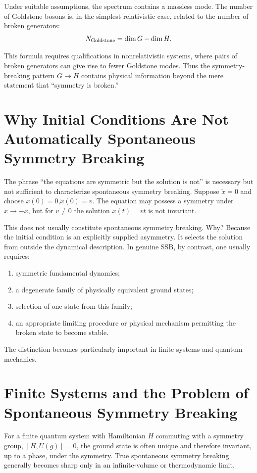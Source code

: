Under suitable assumptions, the spectrum contains a massless mode.
The number of Goldstone bosons is, in the simplest relativistic case, related
to the number of broken generators:
\[N_{\rm Goldstone}=\dim G-\dim H.\]

This formula requires qualifications in nonrelativistic systems, where pairs of
broken generators can give rise to fewer Goldstone modes.
Thus the symmetry-breaking pattern $G\rightarrow H$
contains physical information beyond the mere statement that ``symmetry is broken.''

\section{Why Initial Conditions Are Not Automatically Spontaneous Symmetry Breaking}
The phrase ``the equations are symmetric but the solution is not'' is necessary
but not sufficient to characterize spontaneous symmetry breaking.
Suppose $\ddot{x}=0$ and choose $x(0)=0$,$\dot{x}(0)=v$.
The equation may possess a symmetry under $x\rightarrow-x$,
but for $v\neq0$ the solution $x(t)=vt$ is not invariant.

This does not usually constitute spontaneous symmetry breaking.
Why?
Because the initial condition is an explicitly supplied asymmetry.  It selects
the solution from outside the dynamical description.
In genuine SSB, by contrast, one usually requires:
\begin{enumerate}
\item symmetric fundamental dynamics;
\item a degenerate family of physically equivalent ground states;
\item selection of one state from this family;
\item an appropriate limiting procedure or physical mechanism permitting the
    broken state to become stable.
\end{enumerate}
The distinction becomes particularly important in finite systems and quantum mechanics.

\section{Finite Systems and the Problem of Spontaneous Symmetry Breaking}
For a finite quantum system with Hamiltonian $H$ commuting with a symmetry group,
$[H,U(g)]=0$,
the ground state is often unique and therefore invariant, up to a phase, under
the symmetry.
True spontaneous symmetry breaking generally becomes sharp only in an
infinite-volume or thermodynamic limit.

